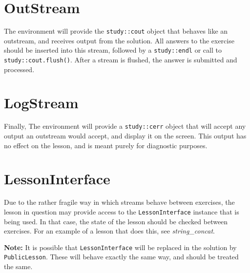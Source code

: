 \documentclass[12pt,a4paper]{report}
\begin{document}
		\section{OutStream}
		The environment will provide the \texttt{study::cout} object that behaves
		like an outstream, and receives output from the solution.  All answers to
		the exercise should be inserted into this stream, followed by a
		\texttt{study::endl} or call to \texttt{study::cout.flush()}.  After a
		stream is flushed, the answer is submitted and processed.

		\section{LogStream}
		Finally, The environment will provide a \texttt{study::cerr} object that
		will accept any output an outstream would accept, and display it on the
		screen.  This output has no effect on the lesson, and is meant purely
		for diagnostic purposes.

		\section{LessonInterface}
		\label{sec:sol_lesson}
		Due to the rather fragile way in which streams behave between exercises,
		the lesson in question may provide access to the \texttt{LessonInterface}
		instance that is being used.  In that case, the state of the lesson should
		be checked between exercises.  For an example of a lesson that does this,
		see \textit{string\_concat}.

		\begin{blockquote}
			\textbf{Note:} It is possible that \texttt{LessonInterface} will be
			replaced in the solution by \texttt{PublicLesson}.  These will behave
			exactly the same way, and should be treated the same.
		\end{blockquote}
\end{document}
